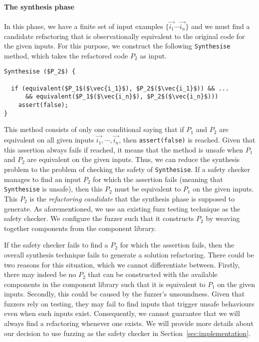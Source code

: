 \documentclass[10pt,conference]{IEEEtran}
\begin{document}
\paragraph{The synthesis phase} In this phase, we have 
a finite set of input examples $\{\vec{i_1} \cdots \vec{i_n}\}$ and we must find a candidate refactoring
that is observationally equivalent to the original code for the given inputs.
For this purpose, we construct the following \texttt{Synthesise} method, which
takes the refactored code $P_2$ as input.

\begin{lstlisting}[mathescape=true,showstringspaces=false]
Synthesise ($P_2$) {

  if (equivalent($P_1$($\vec{i_1}$), $P_2$($\vec{i_1}$)) && ...
      && equivalent($P_1$($\vec{i_n}$), $P_2$($\vec{i_n}$)))
    assert(false);
}
\end{lstlisting}

This method consists of only one conditional saying that if $P_1$ and $P_2$ are equivalent on all given inputs $\vec{i_1}, \cdots, \vec{i_n}$, then \texttt{assert(false)} is reached.
Given that this assertion always fails if reached, it means that the method is unsafe when $P_1$ and $P_2$ are equivalent on the given inputs.
Thus, we can reduce the synthesis problem to the problem of checking the safety of \texttt{Synthesise}. If a safety checker manages to
find an input $P_2$ for which the assertion fails (meaning that \texttt{Synthesise} is unsafe), then this $P_2$ must be equivalent to $P_1$ on the given inputs. This $P_2$ is the {\em refactoring candidate}
that the synthesis phase is supposed to generate. As aforementioned, we use an existing fuzz testing technique
as the safety checker. We configure the fuzzer such that it constructs $P_2$ by weaving together components from the component library.

If the safety checker fails to find a $P_2$ for which the assertion fails, then the overall synthesis technique fails to generate a solution refactoring.
There could be two reasons for this situation, which we cannot differentiate between.
Firstly, there may indeed be no $P_2$ that can be constructed with the available components in the component library such that
it is equivalent to $P_1$ on the given inputs. Secondly, this could be caused by the fuzzer's unsoundness.
Given that fuzzers rely on testing, they may fail to find inputs that trigger unsafe behaviours even when such inputs exist.
Consequently, we cannot guarantee that we will always find a refactoring whenever one exists. We will provide more details about our decision to use fuzzing as the safety checker in 
Section~\ref{sec:implementation}.
\end{document}
